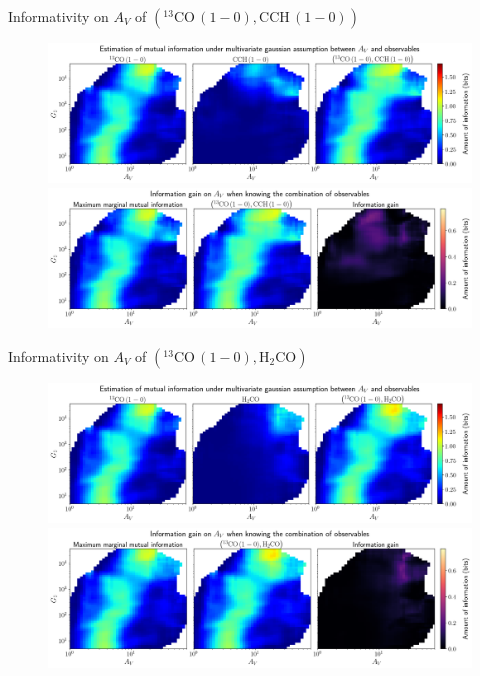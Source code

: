 \documentclass{beamer}
\begin{document}
\begin{frame}{Informativity on $A_V$ of $\left(\mathrm{^{13}CO\,(1-0)},\mathrm{CCH\,(1-0)}\right)$}
    \begin{figure}
        \centering
        \includegraphics[width=0.95\linewidth]{../linearinfo/av__13co10_cch10_linearinfo.png}
        \vfill
        \includegraphics[width=0.95\linewidth]{../linearinfo/av__13co10_cch10_linearinfo_gain.png}
    \end{figure}
\end{frame}

\begin{frame}{Informativity on $A_V$ of $\left(\mathrm{^{13}CO\,(1-0)},\mathrm{H_2CO}\right)$}
    \begin{figure}
        \centering
        \includegraphics[width=0.95\linewidth]{../linearinfo/av__13co10_h2co_linearinfo.png}
        \vfill
        \includegraphics[width=0.95\linewidth]{../linearinfo/av__13co10_h2co_linearinfo_gain.png}
    \end{figure}
\end{frame}
\end{document}
